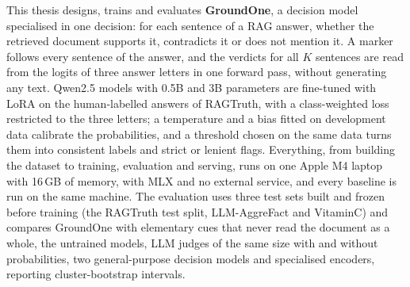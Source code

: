 This thesis designs, trains and evaluates \textbf{GroundOne}, a decision model specialised in one decision: for each sentence
of a RAG answer, whether the retrieved document supports it, contradicts it or does not mention it. A marker follows every
sentence of the answer, and the verdicts for all $K$ sentences are read from the logits of three answer letters in one
forward pass, without generating any text. Qwen2.5 models with 0.5B and 3B parameters are fine-tuned with LoRA on the
human-labelled answers of RAGTruth, with a class-weighted loss restricted to the three letters; a temperature and a bias
fitted on development data calibrate the probabilities, and a threshold chosen on the same data turns them into
consistent labels and strict or lenient flags. Everything, from building the dataset to training, evaluation and serving, runs on one Apple M4 laptop with 16\,GB
of memory, with MLX and no external service, and every baseline is run on the same machine. The evaluation uses three test sets built and frozen before training (the RAGTruth test split,
LLM-AggreFact and VitaminC) and compares GroundOne with elementary cues that never read the document as a whole, the untrained models,
LLM judges of the same size with and without probabilities, two general-purpose decision models and specialised
encoders,
reporting cluster-bootstrap intervals.

